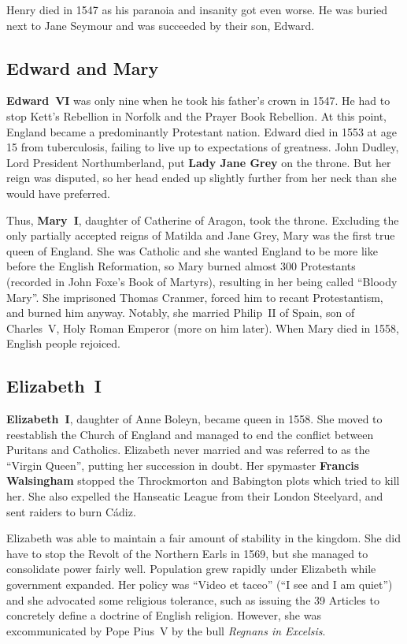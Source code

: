 Henry died in 1547 as his paranoia and insanity got even worse.
He was buried next to Jane Seymour and was succeeded by their son, Edward.

\subsection*{Edward and Mary}

\textbf{Edward~VI} was only nine when he took his father's crown in 1547.
He had to stop Kett's Rebellion in Norfolk and the Prayer Book Rebellion.
At this point, England became a predominantly Protestant nation.
Edward died in 1553 at age 15 from tuberculosis, failing to live up to expectations of greatness.
John Dudley, Lord President Northumberland, put \textbf{Lady Jane Grey} on the throne.
But her reign was disputed, so her head ended up slightly further from her neck than she would have preferred.

Thus, \textbf{Mary~I}, daughter of Catherine of Aragon, took the throne.
Excluding the only partially accepted reigns of Matilda and Jane Grey, Mary was the first true queen of England.
She was Catholic and she wanted England to be more like before the English Reformation,
so Mary burned almost 300 Protestants (recorded in John Foxe's Book of Martyrs),
resulting in her being called ``Bloody Mary''.
She imprisoned Thomas Cranmer, forced him to recant Protestantism, and burned him anyway.
Notably, she married Philip~II of Spain, son of Charles~V, Holy Roman Emperor (more on him later).
When Mary died in 1558, English people rejoiced.

\subsection*{Elizabeth~I}

\textbf{Elizabeth~I}, daughter of Anne Boleyn, became queen in 1558.
She moved to reestablish the Church of England
and managed to end the conflict between Puritans and Catholics.
Elizabeth never married and was referred to as the ``Virgin Queen'', putting her succession in doubt.
Her spymaster \textbf{Francis Walsingham} stopped the Throckmorton and Babington plots which tried to kill her.
She also expelled the Hanseatic League from their London Steelyard, and sent raiders to burn Cádiz.

Elizabeth was able to maintain a fair amount of stability in the kingdom.
She did have to stop the Revolt of the Northern Earls in 1569,
but she managed to consolidate power fairly well.
Population grew rapidly under Elizabeth while government expanded.
Her policy was ``Video et taceo'' (``I see and I am quiet'')
and she advocated some religious tolerance,
such as issuing the 39 Articles to concretely define a doctrine of English religion.
However, she was excommunicated by Pope Pius~V by the bull \textit{Regnans in Excelsis}.

